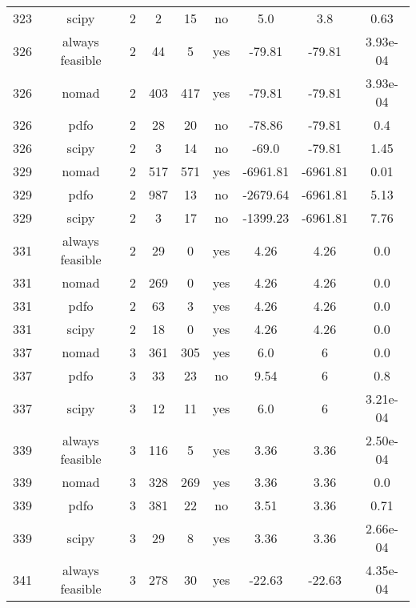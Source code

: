 \begin{footnotesize}
\begin{center}
\begin{longtable}{ccccccccc}
323 &           scipy &  2 &      2 &     15 &      no &         5.0 &         3.8 &     0.63\\
326 & always feasible &  2 &     44 &      5 &     yes &      -79.81 &      -79.81 & 3.93e-04\\
326 &           nomad &  2 &    403 &    417 &     yes &      -79.81 &      -79.81 & 3.93e-04\\
326 &            pdfo &  2 &     28 &     20 &      no &      -78.86 &      -79.81 &      0.4\\
326 &           scipy &  2 &      3 &     14 &      no &       -69.0 &      -79.81 &     1.45\\
329 &           nomad &  2 &    517 &    571 &     yes &    -6961.81 &    -6961.81 &     0.01\\
329 &            pdfo &  2 &    987 &     13 &      no &    -2679.64 &    -6961.81 &     5.13\\
329 &           scipy &  2 &      3 &     17 &      no &    -1399.23 &    -6961.81 &     7.76\\
331 & always feasible &  2 &     29 &      0 &     yes &        4.26 &        4.26 &      0.0\\
331 &           nomad &  2 &    269 &      0 &     yes &        4.26 &        4.26 &      0.0\\
331 &            pdfo &  2 &     63 &      3 &     yes &        4.26 &        4.26 &      0.0\\
331 &           scipy &  2 &     18 &      0 &     yes &        4.26 &        4.26 &      0.0\\
337 &           nomad &  3 &    361 &    305 &     yes &         6.0 &           6 &      0.0\\
337 &            pdfo &  3 &     33 &     23 &      no &        9.54 &           6 &      0.8\\
337 &           scipy &  3 &     12 &     11 &     yes &         6.0 &           6 & 3.21e-04\\
339 & always feasible &  3 &    116 &      5 &     yes &        3.36 &        3.36 & 2.50e-04\\
339 &           nomad &  3 &    328 &    269 &     yes &        3.36 &        3.36 &      0.0\\
339 &            pdfo &  3 &    381 &     22 &      no &        3.51 &        3.36 &     0.71\\
339 &           scipy &  3 &     29 &      8 &     yes &        3.36 &        3.36 & 2.66e-04\\
341 & always feasible &  3 &    278 &     30 &     yes &      -22.63 &      -22.63 & 4.35e-04\\

\end{longtable}
\end{center}
\end{footnotesize}
